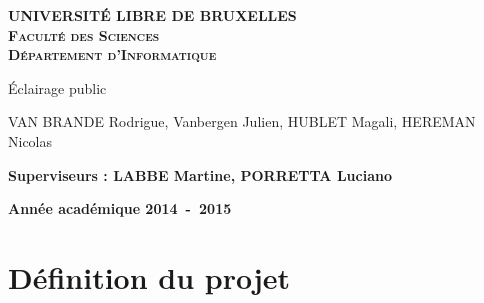 \documentclass[a4paper,10pt]{report}
\begin{document}
\begin{titlepage}
\begin{center}
\textbf{\textsc{UNIVERSIT\'E LIBRE DE BRUXELLES}}\\
\textbf{\textsc{Facult\'e des Sciences}}\\
\textbf{\textsc{D\'epartement d'Informatique}}
\vfill{}\vfill{}
\begin{center}{\Huge \'Eclairage public}\end{center}{\Huge \par}
\begin{center}{\large VAN BRANDE Rodrigue, Vanbergen Julien, HUBLET Magali, HEREMAN Nicolas}\end{center}{\Huge \par}
\vfill{}\vfill{}
\begin{flushleft}{\large \textbf{Superviseurs : LABBE Martine, PORRETTA Luciano}}\hfill{}\end{flushleft}{\large\par}
\vfill{}\vfill{}\enlargethispage{3cm}
\textbf{Ann\'ee acad\'emique 2014~-~2015}
\end{center}
\end{titlepage}



\tableofcontents


\chapter{D\'efinition du projet}





\end{document}
